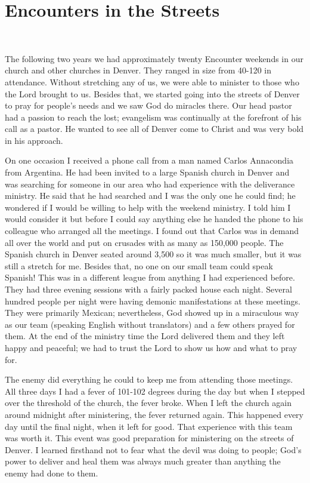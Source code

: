\documentclass[oneside,12pt]{book}
\begin{document}
\section{Encounters in the Streets}
\

The following two years we had approximately twenty Encounter weekends in our church and other churches in Denver. They ranged in size from 40-120 in attendance. Without stretching any of us, we were able to minister to those who the Lord brought to us. Besides that, we started going into the streets of Denver to pray for people's needs and we saw God do miracles there. Our head pastor had a passion to reach the lost; evangelism was continually at the forefront of his call as a pastor. He wanted to see all of Denver come to Christ and was very bold in his approach. 

On one occasion I received a phone call from a man named Carlos Annacondia from Argentina. He had been invited to a large Spanish church in Denver and was searching for someone in our area who had experience with the deliverance ministry. He said that he had searched and I was the only one he could find; he wondered if I would be willing to help with the weekend ministry. I told him I would consider it but before I could say anything else he handed the phone to his colleague who arranged all the meetings. I found out that Carlos was in demand all over the world and put on crusades with as many as 150,000 people. The Spanish church in Denver seated around 3,500 so it was much smaller, but it was still a stretch for me. Besides that, no one on our small team could speak Spanish! This was in a different league from anything I had experienced before. They had three evening sessions with a fairly packed house each night. Several hundred people per night were having demonic manifestations at these meetings. They were primarily Mexican; nevertheless, God showed up in a miraculous way as our team (speaking English without translators) and a few others prayed for them. At the end of the ministry time the Lord delivered them and they left happy and peaceful; we had to trust the Lord to show us how and what to pray for. 

The enemy did everything he could to keep me from attending those meetings. All three days I had a fever of 101-102 degrees during the day but when I stepped over the threshold of the church, the fever broke. When I left the church again around midnight after ministering, the fever returned again. This happened every day until the final night, when it left for good. That experience with this team was worth it. This event was good preparation for ministering on the streets of Denver. I learned firsthand not to fear what the devil was doing to people; God's power to deliver and heal them was always much greater than anything the enemy had done to them. 
\end{document}
